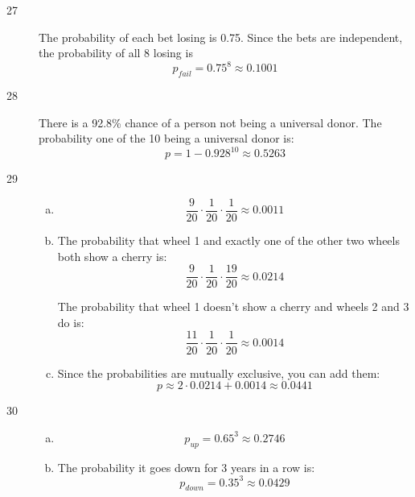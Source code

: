 \documentclass[letterpaper, landscape]{exam}
\begin{document}
    \begin{description}

      \item[27] 
        The probability of each bet losing is 0.75. Since the bets are
        independent, the probability of all 8 losing is
        \[
          p_{fail} = 0.75^8 \approx \boxed{ 0.1001 }
        \]

      \item[28]
        There is a 92.8\% chance of a person not being a universal donor. The
        probability one of the 10 being a universal donor is:
        \[
          p = 1 - 0.928^{10} \approx \boxed{ 0.5263 }
        \]

      \item[29]
        \begin{enumerate}[(a)]
          \item 
            \[
              \frac{9}{20} \cdot \frac{1}{20} \cdot \frac{1}{20} 
                \approx \boxed{ 0.0011 }
            \]

          \item
              The probability that wheel 1 and exactly one of the other two
              wheels both show a cherry is:
              \[
                \frac{9}{20} \cdot \frac{1}{20} \cdot \frac{19}{20} 
                  \approx \boxed{ 0.0214 }
              \]

              The probability that wheel 1 doesn't show a cherry and wheels 2 and 3 
              do is:
              \[
                \frac{11}{20} \cdot \frac{1}{20} \cdot \frac{1}{20} 
                  \approx \boxed{ 0.0014 }
              \]

            \item
              Since the probabilities are mutually exclusive, you can add them:
              \[
                p \approx 2 \cdot 0.0214 + 0.0014 \approx \boxed{ 0.0441 } 
              \]
        \end{enumerate}

      \item[30]
        \begin{enumerate}[(a)]
          \item 
            \[
              p_{up} = 0.65^3 \approx \boxed{ 0.2746 }
            \]

          \item 
            The probability it goes down for 3 years in a row is:
            \[
              p_{down} = 0.35^3 \approx 0.0429
            \]


\end{enumerate}
\end{description}
\end{document}
